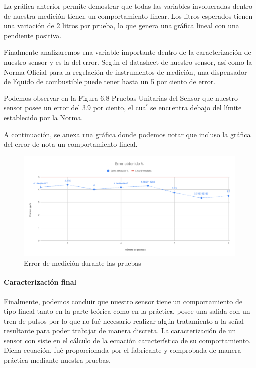 La gráfica anterior permite demostrar que todas las variables involucradas dentro de nuestra medición tienen un comportamiento linear. Los litros esperados tienen una variación de 2 litros por prueba, lo que genera una gráfica lineal con una pendiente positiva.

Finalmente analizaremos una variable importante dentro de la caracterización de nuestro sensor y es la del error. Según el datasheet de nuestro sensor, así como la Norma Oficial para la regulación de instrumentos de medición, una dispensador de líquido de combustible puede tener hasta un 5 por ciento de error.

Podemos observar en la Figura 6.8 Pruebas Unitarias del Sensor que nuestro sensor posee un error del 3.9 por ciento, el cuaĺ se encuentra debajo del límite establecido por la Norma.

A continuación, se anexa una gráfica donde podemos notar que incluso la gráfica del error de nota un comportamiento lineal.

\begin{figure}[H]
	\centering
	\includegraphics[width=1\textwidth]{Capitulo6/caracterizacion/img/Error_porcentaje.png}
	\caption{Error de medición durante las pruebas}
\end{figure}

\paragraph{Caracterización final}Finalmente, podemos concluir que nuestro sensor tiene un comportamiento de tipo lineal tanto en la parte teórica como en la práctica, posee una salida con un tren de pulsos por lo que no fué necesario realizar algún tratamiento a la señal resultante para poder trabajar de manera discreta. La caracterización de un sensor  con siste en el cálculo  de la ecuación característica de su comportamiento. Dicha ecuación, fué proporcionada por el fabricante y comprobada de manera práctica mediante nuestra pruebas.